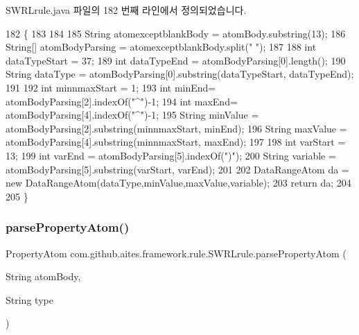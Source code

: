 S\+W\+R\+Lrule.\+java 파일의 182 번째 라인에서 정의되었습니다.


\begin{DoxyCode}
182                                                              \{
183         
184             
185         String atomexceptblankBody = atomBody.substring(13);
186         String[] atomBodyParsing = atomexceptblankBody.split(\textcolor{stringliteral}{" "});
187         
188         \textcolor{keywordtype}{int} dataTypeStart = 37;
189         \textcolor{keywordtype}{int} dataTypeEnd = atomBodyParsing[0].length();
190         String dataType = atomBodyParsing[0].substring(dataTypeStart, dataTypeEnd);
191         
192         \textcolor{keywordtype}{int} minnmaxStart = 1;
193         \textcolor{keywordtype}{int} minEnd= atomBodyParsing[2].indexOf(\textcolor{stringliteral}{"^"})-1;
194         \textcolor{keywordtype}{int} maxEnd= atomBodyParsing[4].indexOf(\textcolor{stringliteral}{"^"})-1;
195         String minValue = atomBodyParsing[2].substring(minnmaxStart, minEnd);
196         String maxValue = atomBodyParsing[4].substring(minnmaxStart, maxEnd);
197         
198         \textcolor{keywordtype}{int} varStart = 13;
199         \textcolor{keywordtype}{int} varEnd = atomBodyParsing[5].indexOf(\textcolor{stringliteral}{")"});
200         String variable = atomBodyParsing[5].substring(varStart, varEnd);
201         
202         DataRangeAtom da = \textcolor{keyword}{new} DataRangeAtom(dataType,minValue,maxValue,variable);
203         \textcolor{keywordflow}{return} da;
204  
205     \}
\end{DoxyCode}
\mbox{\label{classcom_1_1github_1_1aites_1_1framework_1_1rule_1_1_s_w_r_lrule_a5d90fa24f6f2a2db3a435905f68bbce2}} 
\subsubsection{\texorpdfstring{parse\+Property\+Atom()}{parsePropertyAtom()}}
{\footnotesize\ttfamily Property\+Atom com.\+github.\+aites.\+framework.\+rule.\+S\+W\+R\+Lrule.\+parse\+Property\+Atom (\begin{DoxyParamCaption}\item[{String}]{atom\+Body,  }\item[{String}]{type }\end{DoxyParamCaption})\hspace{0.3cm}{\ttfamily [private]}}




